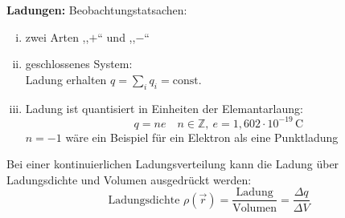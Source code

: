 \documentclass[titlepage,11pt,a4paper,ngerman]{report}
\newcommand{\tx}[1]{\textrm{#1}}
\newcommand{\const}{\tx{const.}}
\begin{document}
\textbf{Ladungen:} Beobachtungstatsachen:
\begin{enumerate}[i)]
	\item zwei Arten ,,$ + $`` und ,,$ - $``
	\item geschlossenes System:\\
	Ladung erhalten $ q = \sum_i q_i = \const $
	\item Ladung ist quantisiert in Einheiten der Elemantarlaung:
	$$ q = n e \quad n \in \mathbb{Z} , \ e = 1{,}602 \cdot 10^{-19} \, \tx{C} $$
	$ n = -1 $ wäre ein Beispiel für ein Elektron als eine Punktladung
\end{enumerate}
Bei einer kontinuierlichen Ladungsverteilung kann die Ladung über Ladungsdichte und Volumen ausgedrückt werden:
\begin{equation*}
\tx{Ladungsdichte } \rho(\vec{r}) = \frac{\tx{Ladung}}{\tx{Volumen}} = \frac{\Delta q}{\Delta V}
\end{equation*}

\end{document}
